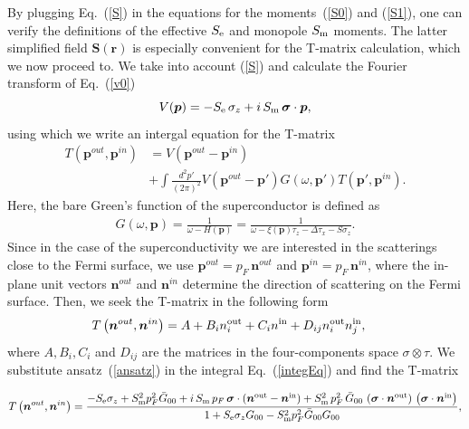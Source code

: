 \documentclass[twocolumn,showpacs,floatfix,nofootinbib,longbibliography]{revtex4-1}
\begin{document}
By plugging Eq.~(\ref{S}) in the equations for the moments~(\ref{S0}) and (\ref{S1}), one can verify the definitions of the effective $S_{\rm e}$ and monopole $S_{\rm m}$ moments.  The latter simplified field $\bm S(\bm r)$ is especially convenient for the T-matrix calculation, which we now proceed to. We take into account (\ref{S}) and calculate the Fourier transform of Eq.~(\ref{v0})  
\begin{equation}
	V(\bm p) = -S_{\rm e}\,\sigma_z +  i \,S_{\rm m} \, \bm \sigma\cdot \bm  p,
	\label{vp}
\end{equation}
using which we write an intergal equation for the T-matrix
\begin{align}
	T\left(\bm p^{out},\bm p^{in}\right) &= V \left(\bm p^{out}-\bm p^{in}\right) \nonumber \\
	& + \int \frac{d^2p'}{(2\pi)^2} V\left(\bm p^{out}-\bm p'\right) G(\omega,\bm p')  T\left(\bm p',\bm p^{in}\right).
	\label{integEq}
\end{align}
Here, the bare Green's function of the superconductor is defined as 
\begin{align}
	G(\omega,\bm p) = \frac{1}{\omega-H(\bm p)} = \frac{1}{\omega-\xi(\bm p)\tau_z-\Delta \tau_x - S\sigma_z}.
\end{align}
Since in the case of the superconductivity we are interested in the scatterings close to the Fermi surface, we use $\bm p^{out} = p_F\, \bm n^{out}$ and $\bm p^{in} = p_F \,\bm n^{in}$, where the in-plane unit vectors $\bm n^{out}$ and $\bm n^{in}$ determine the direction of scattering on the Fermi surface.  Then, we seek the T-matrix in the following form
\begin{align}
	T\left(\bm n^{out},\bm n^{in}\right) &= A + B_i n^{\rm out}_i + C_i n^{\rm in} + D_{ij} n^{\rm out}_i n^{\rm in}_j, \label{ansatz}
\end{align}
where  $A,B_i,C_i$ and $D_{ij}$ are the matrices in the four-components space $\sigma\otimes\tau$. We substitute ansatz~(\ref{ansatz}) in the integral Eq.~(\ref{integEq}) and find the T-matrix
\begin{widetext}
\begin{equation}
	T\left(\bm n^{out},\bm n^{in}\right) = \frac{-S_{\rm e}\sigma_z+S^2_{\rm m}p_F^2\bar G_{00}+i\,S_{\rm m}\,p_F \,  \bm \sigma\cdot(\bm n^{\rm out}- \bm n^{\rm in}) +S^2_{\rm m}\, p^2_F \, \bar G_{00}\,\left(\bm \sigma\cdot\bm n^{\rm out}\right)\,\left(\bm \sigma\cdot \bm n^{\rm in}\right)}{1+S_{\rm e}\sigma_zG_{00}-S^2_{\rm m}p_F^2\bar G_{00} G_{00}},
\end{equation}
\end{widetext}
\end{document}
